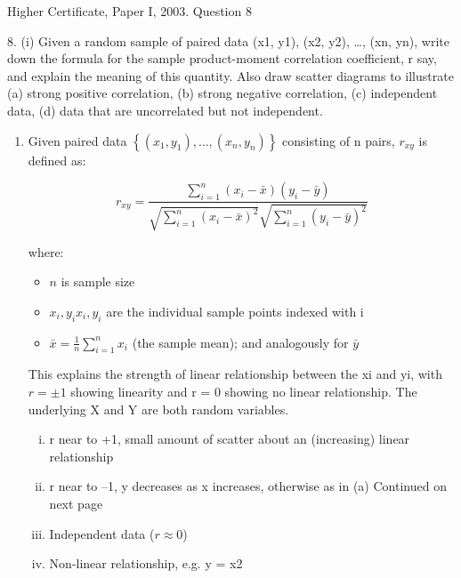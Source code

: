 \documentclass[a4paper,12pt]{article}
\begin{document}
Higher Certificate, Paper I, 2003. Question 8
\begin{framed}









8. (i) Given a random sample of paired data (x1, y1), (x2, y2), …, (xn, yn), write down
the formula for the sample product-moment correlation coefficient, r say, and
explain the meaning of this quantity. Also draw scatter diagrams to illustrate
(a) strong positive correlation,
(b) strong negative correlation,
(c) independent data,
(d) data that are uncorrelated but not independent.
\end{framed}

\begin{enumerate}
\item
Given paired data ${\displaystyle \left\{(x_{1},y_{1}),\ldots ,(x_{n},y_{n})\right\}} $ consisting of n  pairs, $ {\displaystyle r_{xy}}$ is defined as: 



\[  {\displaystyle r_{xy}={\frac {\sum _{i=1}^{n}(x_{i}-{\bar {x}})(y_{i}-{\bar {y}})}{{\sqrt {\sum _{i=1}^{n}(x_{i}-{\bar {x}})^{2}}}{\sqrt {\sum _{i=1}^{n}(y_{i}-{\bar {y}})^{2}}}}}}  \]



 
where:
\begin{itemize}
    \item ${\displaystyle n}$   is sample size
    \item $ {\displaystyle x_{i},y_{i}}  x_{i},y_{i}$ are the individual sample points indexed with i
    \item $ {\displaystyle {\bar {x}}={\frac {1}{n}}\sum _{i=1}^{n}x_{i}}$ (the sample mean); and analogously for $ {\displaystyle {\bar {y}}}  $
\end{itemize}


This explains the strength of linear relationship between the xi and yi, with
$r = \pm 1$ showing linearity and r = 0 showing no linear relationship. The
underlying X and Y are both random variables.
\begin{enumerate}[(i)]
\item r near to +1, small amount of scatter about an (increasing) linear
relationship
\item  r near to –1, y decreases as x increases, otherwise as in (a)
Continued on next page
\item  Independent data ($r \approx 0$)
\item Non-linear relationship, e.g. y = x2
\end{enumerate}


\end{enumerate}
\end{document}
